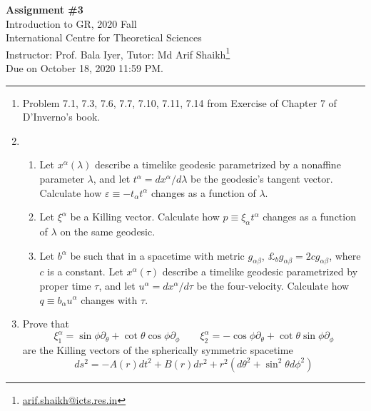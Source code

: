\documentclass{article}
\begin{document}
\begin{center}
  {\bfseries Assignment \#3}\\
  Introduction to GR, 2020 Fall\\
  International Centre for Theoretical Sciences\\
  Instructor: Prof. Bala Iyer, Tutor: Md Arif Shaikh\footnote{\href{mailto: arif.shaikh@icts.res.in}{arif.shaikh@icts.res.in}}\\
  Due on October 18, 2020 11:59 PM.
\end{center}
\hrule

\begin{enumerate}
\item Problem 7.1, 7.3, 7.6, 7.7, 7.10, 7.11, 7.14 from Exercise of Chapter 7 of D'Inverno's book.
\item
  \begin{enumerate}
  \item Let $x^\alpha(\lambda)$ describe a timelike geodesic parametrized by a nonaffine parameter $\lambda$, and let $t^\alpha = dx^\alpha/d\lambda$ be the geodesic's tangent vector. Calculate how $\varepsilon \equiv -t_\alpha t^\alpha$ changes as a function of $\lambda$.
  \item Let $\xi^\alpha$ be a Killing vector. Calculate how $p \equiv \xi_\alpha t^\alpha$ changes as a function of $\lambda$ on the same geodesic.
  \item Let $b^\alpha$ be such that in a spacetime with metric $g_{\alpha\beta}$, $\pounds_b g_{\alpha\beta}=2c g_{\alpha\beta}$, where $c$ is a constant. Let $x^\alpha(\tau)$ describe a timelike geodesic parametrized by proper time $\tau$, and let $u^\alpha = dx^\alpha/d\tau$ be the four-velocity. Calculate how $q\equiv b_\alpha u^\alpha$ changes with $\tau$.
  \end{enumerate}
  
  \item Prove that
    \begin{equation}
      \label{eq:Killing-vectors-sph}
      \xi^\alpha_{1} = \sin\phi\partial_\theta + \cot\theta\cos\phi\partial_\phi\qquad \xi^\alpha_{2} = - \cos\phi\partial_\theta + \cot\theta\sin\phi\partial_\phi
    \end{equation}
    are the Killing vectors of the spherically symmetric spacetime
    \begin{equation}
      \label{eq:line-element-spherically-symmetric}
      ds^2 = -A(r)dt^2 + B(r)dr^2 + r^2 (d\theta^2 + \sin^2\theta d\phi^2)
    \end{equation}


\end{enumerate}
\end{document}
